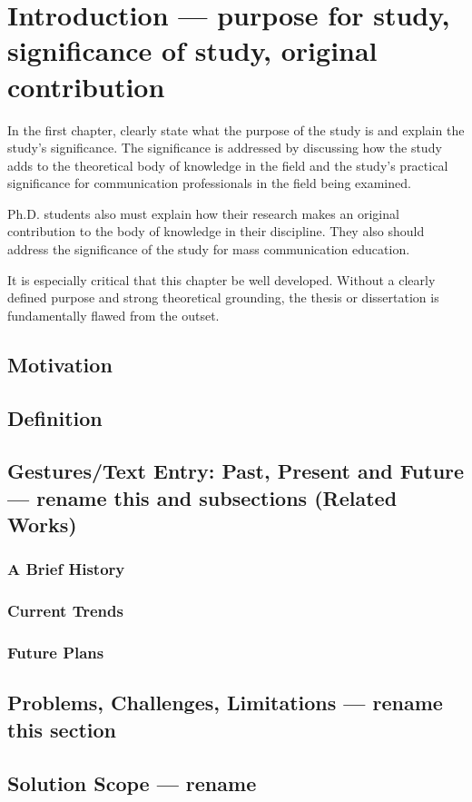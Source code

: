 \chapter{Introduction --- purpose for study, significance of study, original contribution}

In the first chapter, clearly state what the purpose of the study is and explain the study's significance. The
significance is addressed by discussing how the study adds to the theoretical body of knowledge in the field and the
study's practical significance for communication professionals in the field being examined.

Ph.D. students also must explain how their research makes an original contribution to the body of
knowledge in their discipline. They also should address the significance of the study for mass communication
education.

It is especially critical that this chapter be well developed. Without a clearly defined purpose and strong
theoretical grounding, the thesis or dissertation is fundamentally flawed from the outset. 

\section{Motivation}

\section{Definition}

\section{Gestures/Text Entry: Past, Present and Future --- rename this and subsections (Related Works)}

\subsection{A Brief History}

\subsection{Current Trends}

\subsection{Future Plans}

\section{Problems, Challenges, Limitations --- rename this section}

\section{Solution Scope --- rename}